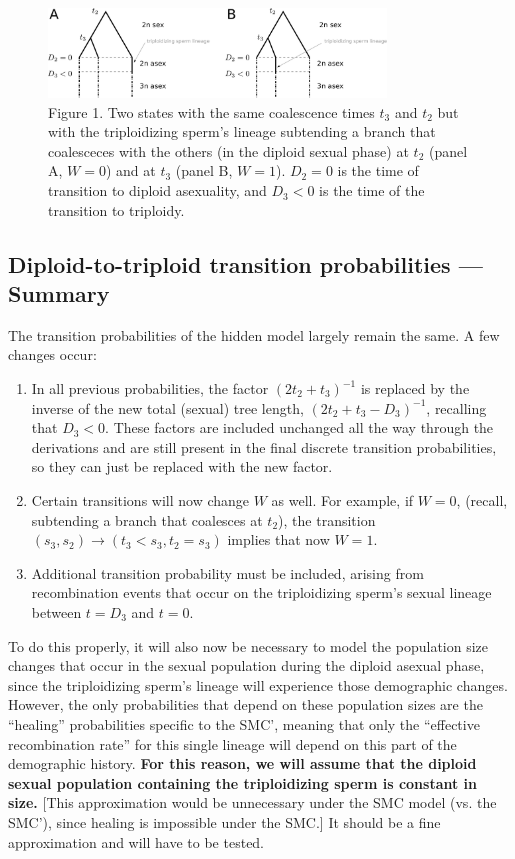 \documentclass{article}
\begin{document}
\begin{figure}[h!]
	\centering
    \includegraphics[width=0.8\textwidth]{figs/diptripstate.pdf}
	\caption{
        Figure 1. Two states with the same coalescence times $t_3$ and $t_2$
        but with the triploidizing sperm's lineage subtending a branch that
        coalesceces with the others (in the diploid sexual phase) at $t_2$
        (panel A, $W = 0$) and at $t_3$ (panel B, $W = 1$). $D_2 = 0$ is the
        time of transition to diploid asexuality, and $D_3 < 0$ is the time of
        the transition to triploidy.
    }
    \label{fig:diptripstate}
\end{figure}

\subsection{Diploid-to-triploid transition probabilities --- Summary}

The transition probabilities of the hidden model largely remain the same. A few
changes occur:
\begin{enumerate}
    \item In all previous probabilities, the factor $(2t_2 + t_3)^{-1}$ is
        replaced by the inverse of the new total (sexual) tree length, $(2t_2 +
        t_3 - D_3)^{-1}$, recalling that $D_3 < 0$. These factors are included
        unchanged all the way through the derivations and are still present in
        the final discrete transition probabilities, so they can just be
        replaced with the new factor.
    \item Certain transitions will now change $W$ as well. For example, if
        $W = 0$, (recall, subtending a branch that coalesces at $t_2$), the
        transition $(s_3, s_2) \to (t_3 < s_3, t_2 = s_3)$ implies that now
        $W = 1$.
    \item Additional transition probability must be included, arising from
        recombination events that occur on the triploidizing sperm's sexual
        lineage between $t = D_3$ and $t = 0$.
\end{enumerate}

To do this properly, it will also now be necessary to model the population size
changes that occur in the sexual population during the diploid asexual phase,
since the triploidizing sperm's lineage will experience those demographic
changes. However, the only probabilities that depend on these population sizes
are the ``healing'' probabilities specific to the SMC', meaning that only the
``effective recombination rate'' for this single lineage will depend on this
part of the demographic history. \textbf{For this reason, we will assume that
the diploid sexual population containing the triploidizing sperm is constant in
size.} [This approximation would be unnecessary under the SMC model (vs. the
SMC'), since healing is impossible under the SMC.] It should be a fine
approximation and will have to be tested.
\end{document}
